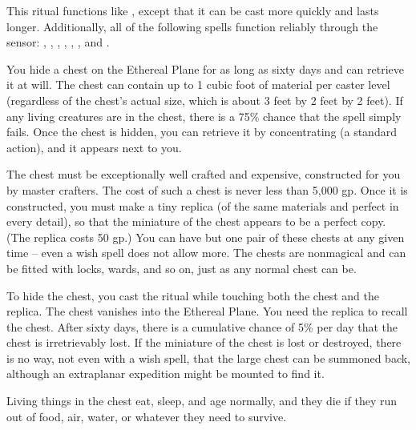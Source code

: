 \spelldur{\durext}
\begin{spelleffect}
This ritual functions like , except that it can be cast more quickly and lasts longer. Additionally, all of the following spells function reliably through the sensor: , , , , , , and .
\end{spelleffect}

\begin{spelleffect}
You hide a chest on the Ethereal Plane for as long as sixty days and can retrieve it at will. The chest can contain up to 1 cubic foot of material per caster level (regardless of the chest's actual size, which is about 3 feet by 2 feet by 2 feet). If any living creatures are in the chest, there is a 75\% chance that the spell simply fails. Once the chest is hidden, you can retrieve it by concentrating (a standard action), and it appears next to you.
\par The chest must be exceptionally well crafted and expensive, constructed for you by master crafters. The cost of such a chest is never less than 5,000 gp. Once it is constructed, you must make a tiny replica (of the same materials and perfect in every detail), so that the miniature of the chest appears to be a perfect copy. (The replica costs 50 gp.) You can have but one pair of these chests at any given time -- even a wish spell does not allow more. The chests are nonmagical and can be fitted with locks, wards, and so on, just as any normal chest can be.
\par To hide the chest, you cast the ritual while touching both the chest and the replica. The chest vanishes into the Ethereal Plane. You need the replica to recall the chest. After sixty days, there is a cumulative chance of 5\% per day that the chest is irretrievably lost. If the miniature of the chest is lost or destroyed, there is no way, not even with a wish spell, that the large chest can be summoned back, although an extraplanar expedition might be mounted to find it.
\par Living things in the chest eat, sleep, and age normally, and they die if they run out of food, air, water, or whatever they need to survive.
\end{spelleffect}

